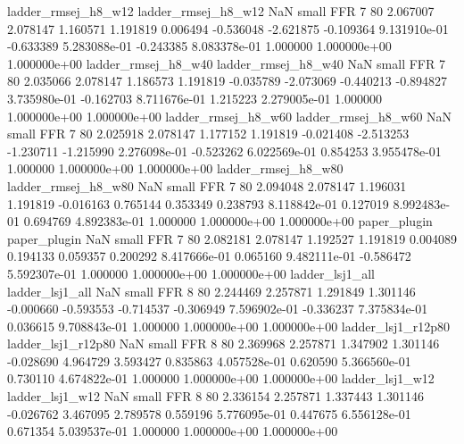      ladder_rmsej_h8_w12      ladder_rmsej_h8_w12                   NaN      small      FFR                 7 80 2.067007       2.078147 1.160571       1.191819    0.006494     -0.536048     -2.621875    -0.109364   9.131910e-01 -0.633389 5.283088e-01    -0.243385   8.083378e-01            1.000000    1.000000e+00        1.000000e+00
     ladder_rmsej_h8_w40      ladder_rmsej_h8_w40                   NaN      small      FFR                 7 80 2.035066       2.078147 1.186573       1.191819   -0.035789     -2.073069     -0.440213    -0.894827   3.735980e-01 -0.162703 8.711676e-01     1.215223   2.279005e-01            1.000000    1.000000e+00        1.000000e+00
     ladder_rmsej_h8_w60      ladder_rmsej_h8_w60                   NaN      small      FFR                 7 80 2.025918       2.078147 1.177152       1.191819   -0.021408     -2.513253     -1.230711    -1.215990   2.276098e-01 -0.523262 6.022569e-01     0.854253   3.955478e-01            1.000000    1.000000e+00        1.000000e+00
     ladder_rmsej_h8_w80      ladder_rmsej_h8_w80                   NaN      small      FFR                 7 80 2.094048       2.078147 1.196031       1.191819   -0.016163      0.765144      0.353349     0.238793   8.118842e-01  0.127019 8.992483e-01     0.694769   4.892383e-01            1.000000    1.000000e+00        1.000000e+00
            paper_plugin             paper_plugin                   NaN      small      FFR                 7 80 2.082181       2.078147 1.192527       1.191819    0.004089      0.194133      0.059357     0.200292   8.417666e-01  0.065160 9.482111e-01    -0.586472   5.592307e-01            1.000000    1.000000e+00        1.000000e+00
         ladder_lsj1_all          ladder_lsj1_all                   NaN      small      FFR                 8 80 2.244469       2.257871 1.291849       1.301146   -0.000660     -0.593553     -0.714537    -0.306949   7.596902e-01 -0.336237 7.375834e-01     0.036615   9.708843e-01            1.000000    1.000000e+00        1.000000e+00
      ladder_lsj1_r12p80       ladder_lsj1_r12p80                   NaN      small      FFR                 8 80 2.369968       2.257871 1.347902       1.301146   -0.028690      4.964729      3.593427     0.835863   4.057528e-01  0.620590 5.366560e-01     0.730110   4.674822e-01            1.000000    1.000000e+00        1.000000e+00
         ladder_lsj1_w12          ladder_lsj1_w12                   NaN      small      FFR                 8 80 2.336154       2.257871 1.337443       1.301146   -0.026762      3.467095      2.789578     0.559196   5.776095e-01  0.447675 6.556128e-01     0.671354   5.039537e-01            1.000000    1.000000e+00        1.000000e+00
